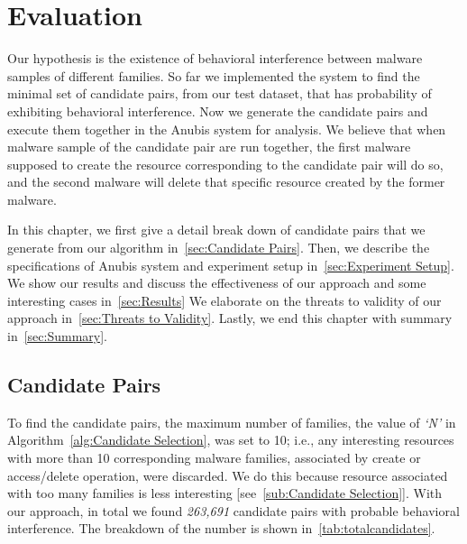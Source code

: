 \chapter{Evaluation}
\label{chapter:evaluation}
Our hypothesis is the existence of behavioral interference between malware samples of different families.
So far we implemented the system to find the minimal set of candidate pairs, from our test dataset, that has probability of exhibiting behavioral interference.
Now we generate the candidate pairs and execute them together in the Anubis system for analysis.
We believe that when malware sample of the candidate pair are run together, the first malware supposed to create the resource corresponding to the candidate pair will do so, and the second malware will delete that specific resource created by the former malware.

In this chapter, we first give a detail break down of candidate pairs that we generate from our algorithm in~\autoref{sec:Candidate Pairs}.
Then, we describe the specifications of Anubis system and experiment setup in~\autoref{sec:Experiment Setup}.
We show our results and discuss the effectiveness of our approach and some interesting cases in~\autoref{sec:Results}
We elaborate on the threats to validity of our approach in~\autoref{sec:Threats to Validity}.
Lastly, we end this chapter with summary in~\autoref{sec:Summary}.

\section{Candidate Pairs}
\label{sec:Candidate Pairs}
To find the candidate pairs, the maximum number of families, the value of \emph{`N'} in Algorithm~\autoref{alg:Candidate Selection}, was set to 10;
i.e., any interesting resources with more than 10 corresponding malware families, associated by create or access/delete operation, were discarded.
We do this because resource associated with too many families is less interesting [see~\autoref{sub:Candidate Selection}].
With our approach, in total we found \emph{263,691} candidate pairs with probable behavioral interference.
The breakdown of the number is shown in~\autoref{tab:totalcandidates}.

